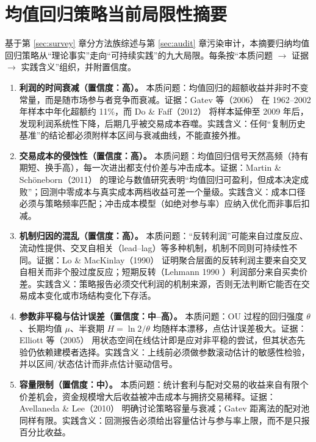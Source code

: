 \section{均值回归策略当前局限性摘要}\label{sec:limitations}

基于第 \ref{sec:survey} 章分方法族综述与第 \ref{sec:audit} 章污染审计，本摘要归纳均值回归策略从“理论事实”走向“可持续实践”的九大局限。每条按“本质问题 $\to$ 证据 $\to$ 实践含义”组织，并附置信度。

\begin{enumerate}
  \item \textbf{利润的时间衰减（置信度：高）。} 本质问题：均值回归的超额收益并非时不变常量，而是随市场参与者竞争而衰减。证据：Gatev 等（2006）\cite{gatev2006} 在 1962--2002 年样本中年化超额约 11\%，而 Do \& Faff（2012）\cite{dofaff2012} 将样本延伸至 2009 年后，发现利润系统性下降，后期几乎被交易成本吞噬。实践含义：任何“复制历史基准”的结论都必须附样本区间与衰减曲线，不能直接外推。

  \item \textbf{交易成本的侵蚀性（置信度：高）。} 本质问题：均值回归信号天然高频（持有期短、换手高），每一次进出都支付价差与冲击成本。证据：Martin \& Sch\"oneborn（2011）\cite{martin2011} 的理论与数值研究表明“均值回归可盈利，但成本决定成败”；回测中零成本与真实成本两档收益可差一个量级。实践含义：成本口径必须与策略频率匹配；冲击成本模型（如绝对参与率）应纳入优化而非事后扣减。

  \item \textbf{机制归因的混乱（置信度：高）。} 本质问题：“反转利润”可能来自过度反应、流动性提供、交叉自相关（lead--lag）等多种机制，机制不同则可持续性不同。证据：Lo \& MacKinlay（1990）\cite{lomackinlay1990} 证明聚合层面的反转利润主要来自交叉自相关而非个股过度反应；短期反转（Lehmann 1990 \cite{lehmann1990}）利润部分来自买卖价差。实践含义：策略报告必须交代利润的机制来源，否则无法判断它能否在交易成本变化或市场结构变化下存活。

  \item \textbf{参数非平稳与估计误差（置信度：中--高）。} 本质问题：OU 过程的回归强度 $\theta$、长期均值 $\mu$、半衰期 $H=\ln 2/\theta$ 均随样本漂移，点估计误差极大。证据：Elliott 等（2005）\cite{elliott2005} 用状态空间在线估计即是应对非平稳的尝试，但其状态先验仍依赖建模者选择。实践含义：上线前必须做参数滚动估计的敏感性检验，并以区间/状态估计而非点估计驱动信号。

  \item \textbf{容量限制（置信度：中）。} 本质问题：统计套利与配对交易的收益来自有限个价差机会，资金规模增大后收益被冲击成本与拥挤交易稀释。证据：Avellaneda \& Lee（2010）\cite{avellaneda2010} 明确讨论策略容量与衰减；Gatev 距离法的配对池同样有限。实践含义：回测报告必须给出容量估计与参与率上限，而不是只报百分比收益。


\end{enumerate}
